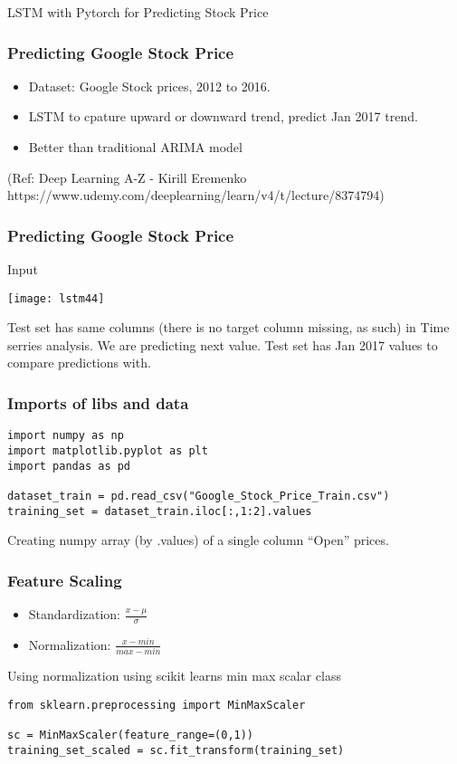 \begin{frame}
  \begin{center}
    {\Large LSTM with Pytorch for Predicting Stock Price}
    
  \end{center}
\end{frame}


\begin{frame}[fragile] \frametitle{Predicting Google Stock Price}
\begin{itemize}
\item Dataset: Google Stock prices, 2012 to 2016.
\item LSTM to cpature upward or downward trend, predict Jan 2017 trend.
\item Better than traditional ARIMA model
\end{itemize}
(Ref: Deep Learning A-Z - Kirill Eremenko https://www.udemy.com/deeplearning/learn/v4/t/lecture/8374794)
\end{frame}



\begin{frame}[fragile] \frametitle{Predicting Google Stock Price}
Input
\begin{center}
\texttt{[image: lstm44]}
\end{center}
Test set has same columns (there is no target column missing, as such) in Time serries analysis. We are predicting next value. Test set has Jan 2017 values to compare predictions with.
\end{frame}


\begin{frame}[fragile] \frametitle{Imports of libs and data}

\begin{lstlisting}
import numpy as np
import matplotlib.pyplot as plt
import pandas as pd

dataset_train = pd.read_csv("Google_Stock_Price_Train.csv")
training_set = dataset_train.iloc[:,1:2].values
\end{lstlisting}
Creating numpy array (by .values) of a single column ``Open'' prices.
\end{frame}

\begin{frame}[fragile] \frametitle{Feature Scaling}
\begin{itemize}
\item Standardization: $\frac{x - \mu}{\sigma}$
\item Normalization: $\frac{x - min}{max - min}$
\end{itemize}
Using normalization using scikit learns min max scalar class
\begin{lstlisting}
from sklearn.preprocessing import MinMaxScaler

sc = MinMaxScaler(feature_range=(0,1))
training_set_scaled = sc.fit_transform(training_set)
\end{lstlisting}
\end{frame}


